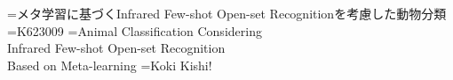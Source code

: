 \documentclass[a4paper,11pt,nomag]{jsreport}
\begin{document}
{}={メタ学習に基づくInfrared Few-shot Open-set Recognitionを考慮した動物分類}
={K623009}           %
={Animal Classification Considering \\ Infrared Few-shot Open-set Recognition \\ Based on Meta-learning}
={Koki Kishi!}

\newpage
\begin{abstract}\hspace{0.5zw}
  
\end{abstract}

\begin{comment}
生物多様性は地球の物質や資源循環において不可欠な役割を担っているが、人間活動による生態系の劣化が進行する中で、効果的な生態系モニタリングの重要性が世界的に高まっている。
このモニタリング手法として、カメラトラップを用いた監視は費用対効果が高く、効率的な手法として注目を集めている。
特に夜間撮影が可能な赤外線カメラの活用が期待されているものの、赤外線画像の分類においては色情報の欠如や学習データの不足などの課題が存在する。

本論文では、カメラトラップを使用した野生動物モニタリングのためのInfrared Few-shot Open-set Recognition (IFOR) フレームワークを提案した。
このフレームワークは、限られた赤外線画像データのみを用いて、モデルに登録された動物種の分類と未登録の動物種の検出を同時に実現することを目的としている。
本研究では、赤外線画像に適した特徴抽出器の特定、少数データに効果的な転移学習の有効性検証、メタ学習の有効性の検証を行っている。
さらに、未登録クラスの多クラス分類精度向上を目的として、k-means損失とBetween-Class損失を導入し、クラス内分散の最小化とクラス間分散の最大化を図った。
実験では、南米で撮影されたWCS Camera Trapsデータセットを学習用に、北米で撮影されたCaltech Camera Trapsデータセットを評価用として使用し、地理的条件の差異に起因するドメインシフトを考慮した評価を行った。

本研究の成果は、限られたデータ条件下における効果的な野生動物モニタリングシステムの実現に向けた重要な知見を提供するものであり、生態学研究における実用的な機械学習モデルの開発基盤として活用されることが期待される。
これらの研究成果は、野生動物との持続可能な共生を目指した生態系モニタリング技術の発展に貢献するものである。
\end{comment}
\end{document}
